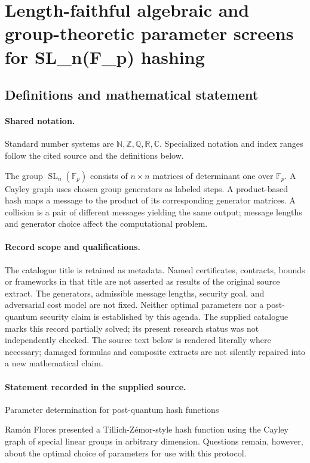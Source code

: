 \documentclass[11pt]{article}
\begin{document}
\section{Length-faithful algebraic and group-theoretic parameter screens for SL\_n(F\_p) hashing}\label{statement}

\subsection{Definitions and mathematical statement}

\paragraph{Shared notation.}Standard number systems are $\mathbb N,\mathbb Z,\mathbb Q,\mathbb R,\mathbb C$. Specialized notation and index ranges follow the cited source and the definitions below.


The group $\operatorname{SL}_n(\mathbb F_p)$ consists of $n\times n$ matrices of determinant one over $\mathbb F_p$. A Cayley graph uses chosen group generators as labeled steps. A product-based hash maps a message to the product of its corresponding generator matrices. A collision is a pair of different messages yielding the same output; message lengths and generator choice affect the computational problem.
\paragraph{Record scope and qualifications.}
The catalogue title is retained as metadata. Named certificates, contracts, bounds or frameworks in that title are not asserted as results of the original source extract.
The generators, admissible message lengths, security goal, and adversarial cost model are not fixed. Neither optimal parameters nor a post-quantum security claim is established by this agenda. The supplied catalogue marks this record partially solved; its present research status was not independently checked.
The source text below is rendered literally where necessary; damaged formulas and composite extracts are not silently repaired into a new mathematical claim.
\paragraph{Statement recorded in the supplied source.}
Parameter determination for post-quantum hash functions

Ramón Flores presented a Tillich-Zémor-style hash function using the Cayley graph of special linear groups in arbitrary dimension. Questions remain, however, about the optimal choice of parameters for use with this protocol.
\end{document}

